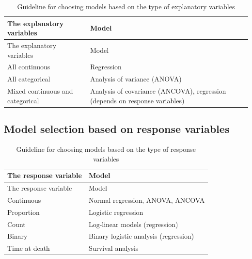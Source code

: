 \documentclass[
]{book}
\begin{document}
\begin{longtable}[]{@{}
  >{\raggedright\arraybackslash}p{}
  >{\raggedright\arraybackslash}p{}@{}}
\caption{\label{tab:guideline-exp} Guideline for choosing models based on the type of explanatory variables}\tabularnewline
\toprule\noalign{}
\begin{minipage}[b]{\linewidth}\raggedright
The explanatory variables
\end{minipage} & \begin{minipage}[b]{\linewidth}\raggedright
Model
\end{minipage} \\
\midrule\noalign{}
\endfirsthead
\toprule\noalign{}
\begin{minipage}[b]{\linewidth}\raggedright
The explanatory variables
\end{minipage} & \begin{minipage}[b]{\linewidth}\raggedright
Model
\end{minipage} \\
\midrule\noalign{}
\endhead
\bottomrule\noalign{}
\endlastfoot
All continuous & Regression \\
All categorical & Analysis of variance (ANOVA) \\
Mixed continuous and categorical & Analysis of covariance (ANCOVA), regression (depends on response variables) \\
\end{longtable}

\subsection{Model selection based on response variables}\label{model-selection-based-on-response-variables}

\begin{longtable}[]{@{}ll@{}}
\caption{\label{tab:guideline-res} Guideline for choosing models based on the type of response variables}\tabularnewline
\toprule\noalign{}
The response variable & Model \\
\midrule\noalign{}
\endfirsthead
\toprule\noalign{}
The response variable & Model \\
\midrule\noalign{}
\endhead
\bottomrule\noalign{}
\endlastfoot
Continuous & Normal regression, ANOVA, ANCOVA \\
Proportion & Logistic regression \\
Count & Log-linear models (regression) \\
Binary & Binary logistic analysis (regression) \\
Time at death & Survival analysis \\
\end{longtable}
\end{document}
